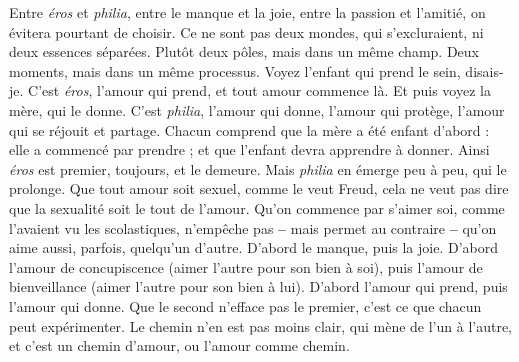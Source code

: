Entre {\it éros} et {\it philia}, entre le manque et la joie, entre la passion et l'amitié,
on évitera pourtant de choisir. Ce ne sont pas deux mondes, qui s’excluraient,
ni deux essences séparées. Plutôt deux pôles, mais dans un même champ. Deux
moments, mais dans un même processus. Voyez l'enfant qui prend le sein,
disais-je. C’est {\it éros}, l'amour qui prend, et tout amour commence là. Et puis
voyez la mère, qui le donne. C’est {\it philia}, l'amour qui donne, l'amour qui protège,
l'amour qui se réjouit et partage. Chacun comprend que la mère a été
enfant d’abord : elle a commencé par prendre ; et que l’enfant devra apprendre
à donner. Ainsi {\it éros} est premier, toujours, et le demeure. Mais {\it philia} en émerge
peu à peu, qui le prolonge. Que tout amour soit sexuel, comme le veut Freud,
cela ne veut pas dire que la sexualité soit le tout de l’amour. Qu’on commence
par s'aimer soi, comme l'avaient vu les scolastiques, n’empêche pas {\bf --} mais
permet au contraire {\bf --} qu’on aime aussi, parfois, quelqu'un d’autre. D'abord le
manque, puis la joie. D’abord l'amour de concupiscence (aimer l’autre pour
son bien à soi), puis l’amour de bienveillance (aimer l’autre pour son bien à
lui). D'abord l'amour qui prend, puis l’amour qui donne. Que le second
n’efface pas le premier, c’est ce que chacun peut expérimenter. Le chemin n’en
est pas moins clair, qui mène de l’un à l’autre, et c’est un chemin d’amour, ou
l'amour comme chemin.

